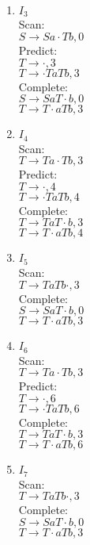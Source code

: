 \documentclass{article}
\begin{document}
\begin{enumerate}
		\item $I_3$\\
		Scan:\\ 
		$S \rightarrow  S a \cdot Tb,0$\\
		Predict:\\
		$T \rightarrow \cdot, 3$\\
		$T \rightarrow \cdot TaTb, 3$\\
		Complete:\\
		$S \rightarrow  S aT \cdot b,0$\\
		$T \rightarrow T \cdot aTb, 3$\\
		\item $I_4$\\
		Scan:\\
		$T \rightarrow Ta \cdot Tb, 3$\\
		Predict:\\
		$T \rightarrow \cdot, 4$\\
		$T \rightarrow \cdot TaTb, 4$\\
		Complete:\\
		$T \rightarrow TaT \cdot b, 3$\\
		$T \rightarrow T \cdot aTb, 4$\\
		 \item $I_5$\\
		 Scan:\\
		$T \rightarrow TaTb \cdot , 3$\\
		Complete:\\
		$S \rightarrow  S aT \cdot b,0$\\
		$T \rightarrow T \cdot aTb, 3$\\
		
		\item $I_6$\\
		Scan: \\
		$T \rightarrow Ta \cdot Tb, 3$\\
			Predict:\\
		$T \rightarrow \cdot, 6$\\
		$T \rightarrow \cdot TaTb, 6$\\
		Complete:\\
		$T \rightarrow TaT \cdot b, 3$\\
		$T \rightarrow T \cdot aTb, 6$\\
		
		\item $I_7$\\
		Scan:\\
		$T \rightarrow TaTb\cdot, 3$\\
		Complete:\\
		$S \rightarrow  S aT \cdot b,0$\\
		$T \rightarrow  T \cdot aTb, 3$\\
		

\end{enumerate}
\end{document}
